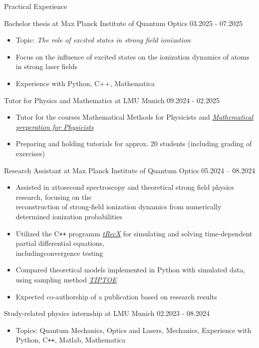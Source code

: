 \documentclass{resume}
\begin{document}
\begin{rSection}{Practical Experience}

    Bachelor thesis at Max Planck Institute of Quantum Optics \hfill 03.2025 - 07.2025
    \begin{itemize}\footnotesize
        \item Topic: \textit{The role of excited states in strong field ionization}
        \item Focus on the influence of excited states on the ionization dynamics of atoms in strong laser fields
        \item Experience with Python, C++, Mathematica
    \end{itemize}

    Tutor for Physics and Mathematics at LMU Munich \hfill 09.2024 - 02.2025
    \begin{itemize}\footnotesize
        \item Tutor for the courses Mathematical Methods for Physicists and \textit{\href{https://www.physik.lmu.de/de/studium/zusatzangebote/mathe-crashkurs/}{Mathematical preperation for Physicists}}
        \item Preparing and holding tutorials for approx. 20 students (including grading of exercises)
    \end{itemize}

    Research Assistant at Max Planck Institute of Quantum Optics \hfill 05.2024 – 08.2024
    \begin{itemize}\footnotesize
        \item Assisted in attosecond spectroscopy and theoretical strong field physics research, focusing on the\\reconstruction of strong-field ionization dynamics from numerically determined ionization probabilities
        \item Utilized the C\texttt{++} programm \textit{\href{https://gitlab.physik.uni-muenchen.de/AG-Scrinzi/tRecX}{tRecX}} for simulating and solving time-dependent partial differential equations,\\includingconvergence testing
        \item Compared theoretical models implemented in Python with simulated data, using sampling method \textit{\href{https://doi.org/10.1364/OPTICA.5.000402}{TIPTOE}}
        \item Expected co-authorship of a publication based on research results
    \end{itemize}

    Study-related physics internship at LMU Munich \hfill 02.2023 - 08.2024
    \begin{itemize}\footnotesize
        \item Topics: Quantum Mechanics, Optics and Lasers, Mechanics, Experience with Python, C\texttt{++}, Matlab, Mathematica
    \end{itemize}

\end{rSection}
\end{document}
